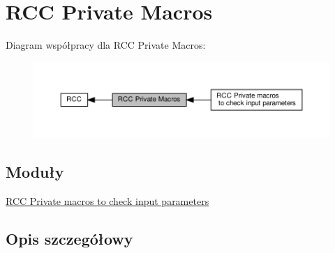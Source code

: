 \hypertarget{group___r_c_c___private___macros}{}\section{R\+CC Private Macros}
\label{group___r_c_c___private___macros}
Diagram współpracy dla R\+CC Private Macros\+:\nopagebreak
\begin{figure}[H]
\begin{center}
\leavevmode
\includegraphics[width=350pt]{group___r_c_c___private___macros}
\end{center}
\end{figure}
\subsection*{Moduły}
\begin{DoxyCompactItemize}
\item 
\hyperlink{group___r_c_c___i_s___r_c_c___definitions}{R\+C\+C Private macros to check input parameters}
\end{DoxyCompactItemize}


\subsection{Opis szczegółowy}
